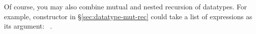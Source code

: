 \begin{isabellebody}
\begin{isamarkuptext}
Of course, you may also combine mutual and nested recursion of datatypes. For example,
constructor  in \S\ref{sec:datatype-mut-rec} could take a list of
expressions as its argument: ~.%
\end{isamarkuptext}%
%
\isadelimtheory
%
\endisadelimtheory
%
\isatagtheory
%
\endisatagtheory
{\isafoldtheory}%
%
\isadelimtheory
%
\endisadelimtheory
\end{isabellebody}%
